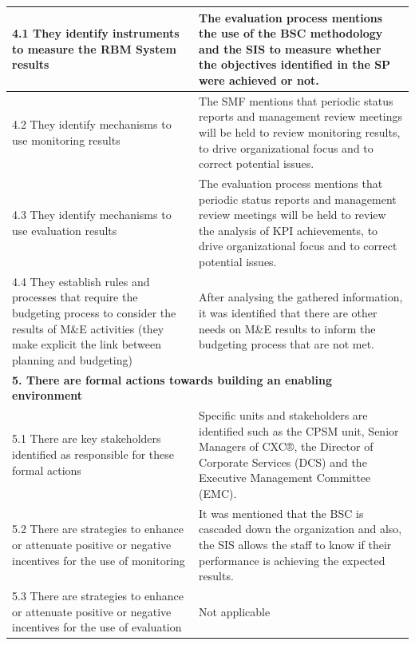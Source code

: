 \documentclass[
  10pt,
]{book}
\begin{document}
\begin{table}
\begin{tabular}[t]{l|l}
\hline
\hspace{1em}4.1 They identify instruments to measure the RBM System results & The evaluation process mentions the use of the BSC methodology and the SIS to measure whether the objectives identified in the SP were achieved or not.\\
\hline
\hspace{1em}4.2 They identify mechanisms to use monitoring results & The SMF mentions that periodic status reports and management review meetings will be held to review monitoring results,   to drive organizational focus and to correct potential issues.\\
\hline
\hspace{1em}4.3 They identify mechanisms to use evaluation results & The evaluation process mentions that periodic status reports and management review meetings will be held to review the analysis of KPI achievements, to drive organizational focus and to correct potential issues.\\
\hline
\hspace{1em}4.4 They establish rules and processes that require the budgeting process to consider the results of M\&E activities (they make explicit the link between planning and budgeting) & After analysing the gathered information, it was identified that there are other needs on M\&E results to inform the budgeting process that are not met.\\
\hline
\multicolumn{2}{l}{\textbf{5. There are formal actions towards building an enabling environment}}\\
\hline
\hspace{1em}\hspace{1em}5.1 There are key stakeholders identified as responsible for these formal actions & Specific units and stakeholders are identified such as the CPSM unit, Senior Managers of CXC®,  the Director of Corporate Services (DCS) and the Executive Management Committee (EMC).\\
\hline
\hspace{1em}\hspace{1em}5.2 There are strategies to enhance or attenuate positive or negative incentives for the use of monitoring & It was mentioned that the BSC is cascaded down the organization and also, the SIS  allows the staff to know if their performance is achieving the expected results.\\
\hline
\hspace{1em}5.3 There are strategies to enhance or attenuate positive or negative incentives for the use of evaluation & Not applicable\\

\end{tabular}
\end{table}
\end{document}
